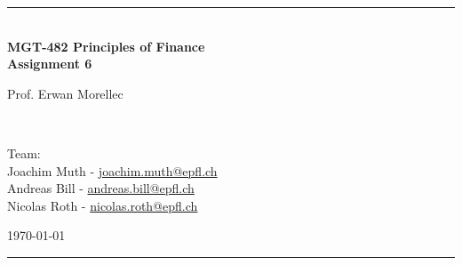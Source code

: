 \documentclass[a4paper,11pt,twoside]{article}
\newcommand{\mail}[1]{{\href{mailto:#1}{#1}}}
\begin{document}
\begin{titlepage} %
\begin{center}
\newcommand{\HRule}{\rule{\linewidth}{0.5mm}} %
\center %
 
 




\begin{figure} [h] %
\centerline{
} 
\end{figure}

\HRule \\[0.4cm]
{ \huge \bfseries MGT-482 Principles of Finance \\Assignment 6}\\[0.4cm] %

\begin{minipage}[t]{0.4\textwidth}
\flushleft
Prof. Erwan Morellec
\end{minipage}
~
\begin{minipage}[t]{0.55\textwidth}
\flushright
Team: \\
Joachim Muth - \mail{joachim.muth@epfl.ch}\\
Andreas Bill - \mail{andreas.bill@epfl.ch}\\
Nicolas Roth - \mail{nicolas.roth@epfl.ch}\\
\end{minipage}
\begin{center}
\today
\end{center}
\HRule \\

\end{center}
\end{titlepage}



\pagestyle{fancy}

\end{document}
